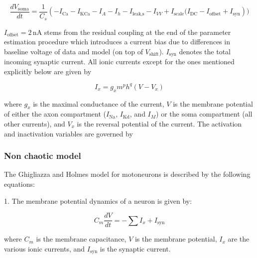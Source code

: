 \begin{equation}
	\frac{dV_{\text{soma}}}{dt} = \frac{1}{C_s} \left( -I_{\text{Ca}} - I_{\text{KCa}} - I_A - I_h - I_{\text{leak,s}} - I_{VV} + I_{\text{scale}} (I_{\text{DC}} - I_{\text{offset}} + I_{\text{syn}} \right))
\end{equation}

$I_{\text{offset}} = 2 \, \text{nA}$ stems from the residual coupling at the end of the parameter estimation procedure which introduces a current bias due to differences in baseline voltage of data and model (on top of $V_{\text{shift}}$). $I_{\text{syn}}$ denotes the total incoming synaptic current. All ionic currents except for the ones mentioned explicitly below are given by

\begin{equation}
	I_x = g_x m^p h^q (V - V_x)
\end{equation}

where $g_x$ is the maximal conductance of the current, $V$ is the membrane potential of either the axon compartment ($I_{\text{Na}}$, $I_{\text{Kd}}$, and $I_M$) or the soma compartment (all other currents), and $V_x$ is the reversal potential of the current. The activation and inactivation variables are governed by

%
%
%

\subsubsection{Non chaotic model \cite{ghigliazza_minimal_2004}}
The Ghigliazza and Holmes model for motoneurons is described by the following equations:

1. The membrane potential dynamics of a neuron is given by:

\begin{equation}
	C_m \frac{dV}{dt} = -\sum I_x + I_{\text{syn}}
\end{equation}

where \( C_m \) is the membrane capacitance, \( V \) is the membrane potential, \( I_x \) are the various ionic currents, and \( I_{\text{syn}} \) is the synaptic current.

